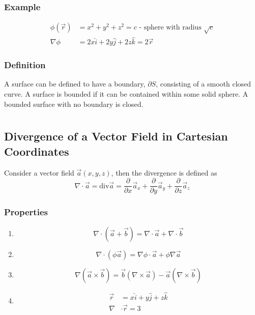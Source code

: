 \documentclass[a4paper, 11pt, normalem]{report}
\newcommand\p{\partial}
\begin{document}
\subsection{Example}
\begin{align*}
    \phi(\vec{r}) &= x^2 + y^2 + z^2 = c \text{ - sphere with radius }\sqrt{c} \\
    \nabla\phi &= 2x\hat{i} + 2y\hat{j} + 2z\hat{k} = 2\vec{r}
\end{align*}

\subsection{Definition}
A surface can be defined to have a boundary, $\p S$, consisting of a smooth closed curve.
A surface is bounded if it can be contained within some solid sphere.
A bounded surface with no boundary is closed.

\chapter{}
\section{Divergence of a Vector Field in Cartesian Coordinates}
Consider a vector field $\vec{a}(x,y,z)$, then the divergence is defined as
\begin{equation*}
    \nabla \cdot \vec{a} = \text{div}\vec{a} = \frac{\p}{\p x}\vec{a}_x + \frac{\p}{\p y}\vec{a}_y + \frac{\p}{\p z}\vec{a}_z
\end{equation*}

\subsection{Properties}
\begin{enumerate}
    \item
            \begin{equation*}
                \nabla \cdot (\vec{a} + \vec{b}) = \nabla\cdot\vec{a} + \nabla\cdot\vec{b}
            \end{equation*}
    \item
            \begin{equation*}
                \nabla\cdot(\phi\vec{a}) = \nabla\phi \cdot \vec{a} + \phi\nabla\vec{a}
            \end{equation*}
    \item
            \begin{equation*}
                \nabla (\vec{a} \times \vec{b}) = \vec{b}(\nabla \times \vec{a}) - \vec{a}(\nabla\times\vec{b})
            \end{equation*}
    \item
            \begin{align*}
                \vec{r} &= x\hat{i} + y\hat{j} + z\hat{k} \\
                \nabla &\cdot \vec{r} = 3
            \end{align*}
\end{enumerate}
\end{document}
